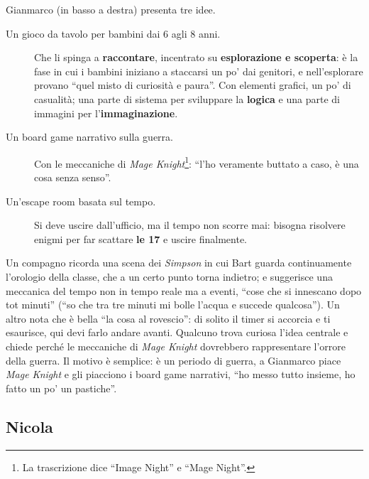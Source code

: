 Gianmarco (in basso a destra) presenta tre idee.
\begin{description}
  \item[Un gioco da tavolo per bambini dai 6 agli 8 anni.] Che li spinga a
        \textbf{raccontare}, incentrato su \textbf{esplorazione e scoperta}: è la fase in
        cui i bambini iniziano a staccarsi un po' dai genitori, e nell'esplorare provano
        ``quel misto di curiosità e paura''. Con elementi grafici, un po' di
        casualità; una parte di sistema per sviluppare la \textbf{logica} e una parte di
        immagini per l'\textbf{immaginazione}.
  \item[Un board game narrativo sulla guerra.] Con le meccaniche di \emph{Mage
        Knight}\footnote{La trascrizione dice ``Image Night'' e ``Mage Night''.}:
        ``l'ho veramente buttato a caso, è una cosa senza senso''.
  \item[Un'escape room basata sul tempo.] Si deve uscire dall'ufficio, ma il tempo
        non scorre mai: bisogna risolvere enigmi per far scattare \textbf{le 17} e
        uscire finalmente.
\end{description}
Un compagno ricorda una scena dei \emph{Simpson} in cui Bart guarda continuamente
l'orologio della classe, che a un certo punto torna indietro; e suggerisce una
meccanica del tempo non in tempo reale ma a eventi, ``cose che si innescano dopo tot
minuti'' (``so che tra tre minuti mi bolle l'acqua e succede qualcosa''). Un altro
nota che è bella ``la cosa al rovescio'': di solito il timer si accorcia e ti
esaurisce, qui devi farlo andare avanti. Qualcuno trova curiosa l'idea centrale e
chiede perché le meccaniche di \emph{Mage Knight} dovrebbero rappresentare l'orrore
della guerra. Il motivo è semplice: è un periodo di guerra, a Gianmarco piace
\emph{Mage Knight} e gli piacciono i board game narrativi, ``ho messo tutto insieme,
ho fatto un po' un pastiche''.

\subsection{Nicola}
\label{a7:sec:idee-nicola}

